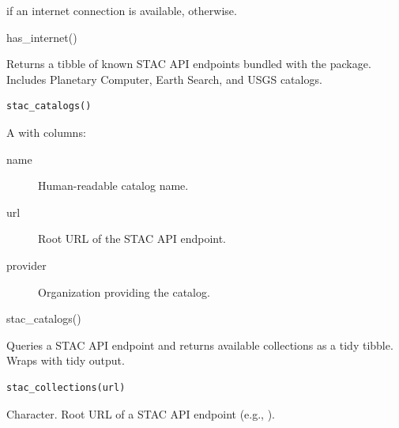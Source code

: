 \documentclass[a4paper]{book}
\begin{document}
%
\begin{Value}
 if an internet connection is available,  otherwise.
\end{Value}
%
\begin{Examples}
\begin{ExampleCode}
has_internet()
\end{ExampleCode}
\end{Examples}
%
\begin{Description}
Returns a tibble of known STAC API endpoints bundled with the package.
Includes Planetary Computer, Earth Search, and USGS catalogs.
\end{Description}
%
\begin{Usage}
\begin{verbatim}
stac_catalogs()
\end{verbatim}
\end{Usage}
%
\begin{Value}
A  with columns:
\begin{description}

\item[name] Human-readable catalog name.
\item[url] Root URL of the STAC API endpoint.
\item[provider] Organization providing the catalog.

\end{description}

\end{Value}
%
\begin{Examples}
\begin{ExampleCode}
stac_catalogs()
\end{ExampleCode}
\end{Examples}
%
\begin{Description}
Queries a STAC API endpoint and returns available collections as a tidy
tibble. Wraps  with tidy output.
\end{Description}
%
\begin{Usage}
\begin{verbatim}
stac_collections(url)
\end{verbatim}
\end{Usage}
%
\begin{Arguments}
\begin{ldescription}
\item[\code{url}] Character. Root URL of a STAC API endpoint
(e.g., ).
\end{ldescription}
\end{Arguments}
\end{document}
